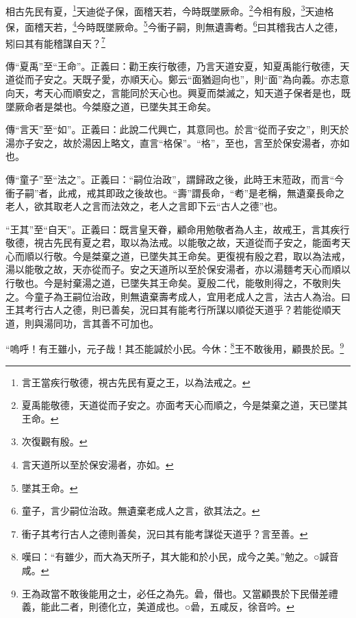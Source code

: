 相古先民有夏，\footnote{言王當疾行敬德，視古先民有夏之王，以為法戒之。}天迪從子保，面稽天若，今時既墜厥命。\footnote{夏禹能敬德，天道從而子安之。亦面考天心而順之，今是桀棄之道，天已墜其王命。}今相有殷，\footnote{次復觀有殷。}天迪格保，面稽天若，\footnote{言天道所以至於保安湯者，亦如。}今時既墜厥命。\footnote{墜其王命。}今衝子嗣，則無遺壽耇。\footnote{童子，言少嗣位治政。無遺棄老成人之言，欲其法之。}曰其稽我古人之德，矧曰其有能稽謀自天？\footnote{衝子其考行古人之德則善矣，況曰其有能考謀從天道乎？言至善。}


{\noindent\zhuan{}\fzbyks 傳“夏禹”至“王命”。正義曰：勸王疾行敬德，乃言天道安夏，知夏禹能行敬德，天道從而子安之。天既子愛，亦順天心。鄭云“面猶迴向也”，則“面”為向義。亦志意向天，考天心而順安之，言能同於天心也。興夏而桀滅之，知天道子保者是也，既墜厥命者是桀也。今桀廢之道，已墜失其王命矣。 \par}

{\noindent\zhuan{}\fzbyks 傳“言天”至“如”。正義曰：此說二代興亡，其意同也。於言“從而子安之”，則天於湯亦子安之，故於湯因上略文，直言“格保”。“格”，至也，言至於保安湯者，亦如也。 \par}

{\noindent\zhuan{}\fzbyks 傳“童子”至“法之”。正義曰：“嗣位治政”，謂歸政之後，此時王末蒞政，而言“今衝子嗣”者，此戒，戒其即政之後故也。“壽”謂長命，“耇”是老稱，無遺棄長命之老人，欲其取老人之言而法效之，老人之言即下云“古人之德”也。 \par}

{\noindent\shu{}\fzkt “王其”至“自天”。正義曰：既言皇天眷，顧命用勉敬者為人主，故戒王，言其疾行敬德，視古先民有夏之君，取以為法戒。以能敬之故，天道從而子安之，能面考天心而順以行敬。今是桀棄之道，已墜失其王命矣。更復視有殷之君，取以為法戒，湯以能敬之故，天亦從而子。安之天道所以至於保安湯者，亦以湯麵考天心而順以行敬也。今是紂棄湯之道，已墜失其王命矣。夏殷二代，能敬則得之，不敬則失之。今童子為王嗣位治政，則無遺棄壽考成人，宜用老成人之言，法古人為治。曰王其考行古人之德，則已善矣，況曰其有能考行所謀以順從天道乎？若能從順天道，則與湯同功，言其善不可加也。 \par}

“嗚呼！有王雖小，元子哉！其丕能諴於小民。今休：\footnote{嘆曰：“有雖少，而大為天所子，其大能和於小民，成今之美。”勉之。○諴音咸。}王不敢後用，顧畏於民。\footnote{王為政當不敢後能用之士，必任之為先。碞，僣也。又當顧畏於下民僣差禮義，能此二者，則德化立，美道成也。○碞，五咸反，徐音吟。}


